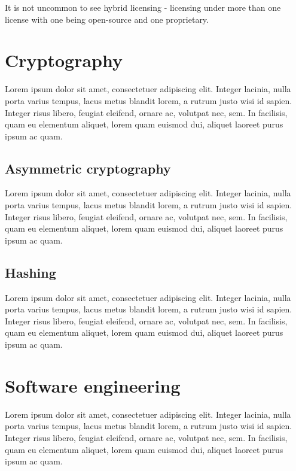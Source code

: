 \documentclass[thesismargins, english, thesislinespacing, twoside, openright, upjsfrontpage]{rnthesis}
\begin{document}
It is not uncommon to see hybrid licensing - licensing under more than one license with one being open-source and one proprietary.


\section{Cryptography}

Lorem ipsum dolor sit amet, consectetuer adipiscing elit.
Integer lacinia, nulla porta varius tempus, lacus metus blandit
lorem, a rutrum justo wisi id sapien. Integer risus libero,
feugiat eleifend, ornare ac, volutpat nec, sem. In facilisis,
quam eu elementum aliquet, lorem quam euismod dui, aliquet
laoreet purus ipsum ac quam.

\subsection{Asymmetric cryptography}

Lorem ipsum dolor sit amet, consectetuer adipiscing elit.
Integer lacinia, nulla porta varius tempus, lacus metus blandit
lorem, a rutrum justo wisi id sapien. Integer risus libero,
feugiat eleifend, ornare ac, volutpat nec, sem. In facilisis,
quam eu elementum aliquet, lorem quam euismod dui, aliquet
laoreet purus ipsum ac quam.

\subsection{Hashing}

Lorem ipsum dolor sit amet, consectetuer adipiscing elit.
Integer lacinia, nulla porta varius tempus, lacus metus blandit
lorem, a rutrum justo wisi id sapien. Integer risus libero,
feugiat eleifend, ornare ac, volutpat nec, sem. In facilisis,
quam eu elementum aliquet, lorem quam euismod dui, aliquet
laoreet purus ipsum ac quam.

\section{Software engineering}

Lorem ipsum dolor sit amet, consectetuer adipiscing elit.
Integer lacinia, nulla porta varius tempus, lacus metus blandit
lorem, a rutrum justo wisi id sapien. Integer risus libero,
feugiat eleifend, ornare ac, volutpat nec, sem. In facilisis,
quam eu elementum aliquet, lorem quam euismod dui, aliquet
laoreet purus ipsum ac quam.
\end{document}
